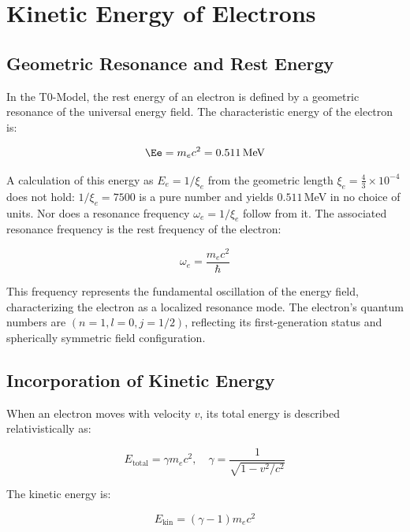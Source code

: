 \section{Kinetic Energy of Electrons}
\label{sec:electron_kinetic_energy}

\subsection{Geometric Resonance and Rest Energy}
\label{subsec:electron_rest_energy}

In the T0-Model, the rest energy of an electron is defined by a geometric resonance of the universal energy field. The characteristic energy of the electron is:

\begin{equation}
	\Ee = m_e c^2 = 0.511 \, \text{MeV}
\end{equation}

A calculation of this energy as $E_e = 1/\xi_e$ from the geometric length $\xi_e = \frac{4}{3} \times 10^{-4}$ does not hold: $1/\xi_e = 7500$ is a pure number and yields $0.511$\,MeV in no choice of units. Nor does a resonance frequency $\omega_e = 1/\xi_e$ follow from it. The associated resonance frequency is the rest frequency of the electron:

\begin{equation}
	\omega_e = \frac{m_e c^2}{\hbar}
\end{equation}

This frequency represents the fundamental oscillation of the energy field, characterizing the electron as a localized resonance mode. The electron's quantum numbers are \((n=1, l=0, j=1/2)\), reflecting its first-generation status and spherically symmetric field configuration.

\subsection{Incorporation of Kinetic Energy}
\label{subsec:electron_kinetic}

When an electron moves with velocity \( v \), its total energy is described relativistically as:

\begin{equation}
	E_{\text{total}} = \gamma m_e c^2, \quad \gamma = \frac{1}{\sqrt{1 - v^2/c^2}}
\end{equation}

The kinetic energy is:

\begin{equation}
	E_{\text{kin}} = (\gamma - 1) m_e c^2
\end{equation}

